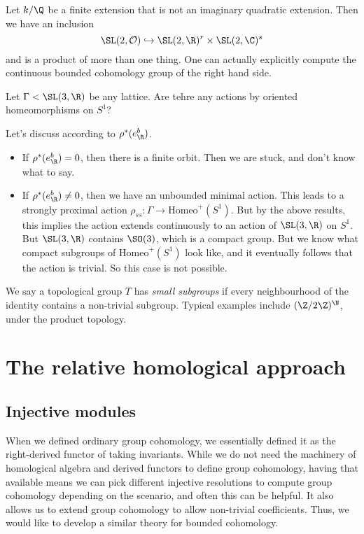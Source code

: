 \documentclass[a4paper]{article}
\newcommand\Homeo{\mathrm{Homeo}}
\begin{document}
\begin{eg}
  Let $k/\Q$ be a finite extension that is not an imaginary quadratic extension. Then we have an inclusion
  \[
    \SL(2, \mathcal{O}) \hookrightarrow \SL(2, \R)^r \times \SL(2, \C)^s
  \]
  and is a product of more than one thing. One can actually explicitly compute the continuous bounded cohomology group of the right hand side.
\end{eg}

\begin{ex}
  Let $\Gamma < \SL(3, \R)$ be any lattice. Are tehre any actions by oriented homeomorphisms on $S^1$?

  Let's discuss according to $\rho^*(e^b_\R)$.
  \begin{itemize}
    \item If $\rho^*(e^b_\R) = 0$, then there is a finite orbit. Then we are stuck, and don't know what to say.
    \item If $\rho^*(e^b_\R) \not= 0$, then we have an unbounded minimal action. This leads to a strongly proximal action $\rho_{ss}: \Gamma \to \Homeo^+(S^1)$. But by the above results, this implies the action extends continuously to an action of $\SL(3, \R)$ on $S^1$. But $\SL(3, \R)$ contains $\SO(3)$, which is a compact group. But we know what compact subgroups of $\Homeo^+(S^1)$ look like, and it eventually follows that the action is trivial. So this case is not possible.
  \end{itemize}
\end{ex}

We say a topological group $T$ has \emph{small subgroups} if every neighbourhood of the identity contains a non-trivial subgroup. Typical examples include $(\Z/2\Z)^\N$, under the product topology.

\section{The relative homological approach}
\subsection{Injective modules}
When we defined ordinary group cohomology, we essentially defined it as the right-derived functor of taking invariants. While we do not need the machinery of homological algebra and derived functors to define group cohomology, having that available means we can pick different injective resolutions to compute group cohomology depending on the scenario, and often this can be helpful. It also allows us to extend group cohomology to allow non-trivial coefficients. Thus, we would like to develop a similar theory for bounded cohomology.
\end{document}
